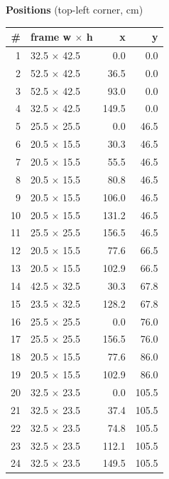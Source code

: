 \documentclass[a4paper,landscape,10pt]{article}
\begin{document}
\begin{minipage}[t]{0.25\textwidth}
\vspace{8pt}
{\bfseries Positions} (top-left corner, cm)\\[2pt]
\tiny
\begin{tabular}{@{}r l r r@{}}
\toprule
\# & frame w $\times$ h & x & y \\
\midrule
1 & 32.5 $\times$ 42.5 & 0.0 & 0.0 \\
2 & 52.5 $\times$ 42.5 & 36.5 & 0.0 \\
3 & 52.5 $\times$ 42.5 & 93.0 & 0.0 \\
4 & 32.5 $\times$ 42.5 & 149.5 & 0.0 \\
5 & 25.5 $\times$ 25.5 & 0.0 & 46.5 \\
6 & 20.5 $\times$ 15.5 & 30.3 & 46.5 \\
7 & 20.5 $\times$ 15.5 & 55.5 & 46.5 \\
8 & 20.5 $\times$ 15.5 & 80.8 & 46.5 \\
9 & 20.5 $\times$ 15.5 & 106.0 & 46.5 \\
10 & 20.5 $\times$ 15.5 & 131.2 & 46.5 \\
11 & 25.5 $\times$ 25.5 & 156.5 & 46.5 \\
12 & 20.5 $\times$ 15.5 & 77.6 & 66.5 \\
13 & 20.5 $\times$ 15.5 & 102.9 & 66.5 \\
14 & 42.5 $\times$ 32.5 & 30.3 & 67.8 \\
15 & 23.5 $\times$ 32.5 & 128.2 & 67.8 \\
16 & 25.5 $\times$ 25.5 & 0.0 & 76.0 \\
17 & 25.5 $\times$ 25.5 & 156.5 & 76.0 \\
18 & 20.5 $\times$ 15.5 & 77.6 & 86.0 \\
19 & 20.5 $\times$ 15.5 & 102.9 & 86.0 \\
20 & 32.5 $\times$ 23.5 & 0.0 & 105.5 \\
21 & 32.5 $\times$ 23.5 & 37.4 & 105.5 \\
22 & 32.5 $\times$ 23.5 & 74.8 & 105.5 \\
23 & 32.5 $\times$ 23.5 & 112.1 & 105.5 \\
24 & 32.5 $\times$ 23.5 & 149.5 & 105.5 \\
\bottomrule
\end{tabular}
\end{minipage}
\clearpage
\end{document}
